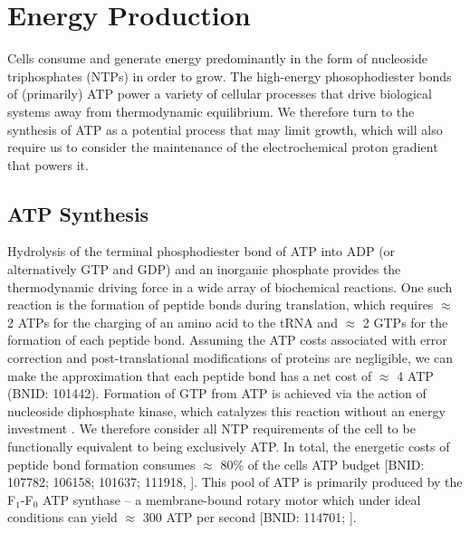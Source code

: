 \section{Energy Production}
Cells consume and generate energy predominantly in the form of nucleoside
triphosphates (NTPs) in order to grow. The high-energy phosophodiester bonds of
(primarily) ATP power a variety of cellular processes that drive biological
systems away from thermodynamic equilibrium. We therefore turn to the synthesis
of ATP as a potential process that may limit growth, which will also require us
to consider the maintenance of the electrochemical proton gradient that powers
it.

\subsection{ATP Synthesis}
Hydrolysis of the terminal phosphodiester bond of ATP into ADP (or
alternatively GTP and GDP) and an inorganic phosphate provides the
thermodynamic driving force in a wide array of biochemical reactions. One
such reaction is the formation of peptide bonds during translation, which
requires $\approx$ 2 ATPs for the charging of an amino acid to the tRNA and
$\approx$ 2 GTPs for the formation of each peptide bond. Assuming the ATP
costs associated with error correction and post-translational modifications
of proteins are negligible, we can make the approximation that each peptide
bond has a net cost of $\approx$ 4 ATP (BNID: 101442).
Formation of GTP from ATP is achieved via the action of nucleoside
diphosphate kinase, which catalyzes this reaction without an energy
investment \citep{lascu2000}. We therefore consider all NTP requirements of
the cell to be functionally equivalent to being exclusively ATP. In total,
the energetic costs of peptide bond formation consumes $\approx$ 80\% of the
cells ATP budget [BNID: 107782; 106158; 101637; 111918,
\cite{lynch2015,stouthamer1973}]. This pool of ATP is primarily produced by the
F$_1$-F$_0$ ATP synthase -- a membrane-bound rotary motor which under ideal
conditions can yield $\approx$ 300 ATP per second [BNID: 114701;
\cite{weber2003}].

